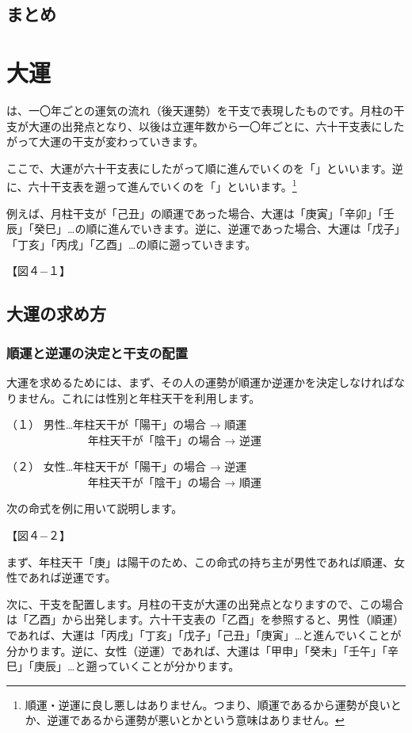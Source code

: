\documentclass[a5paper,11pt,dvipdfmx]{tarticle}
\begin{document}
\subsection{まとめ}


\clearpage

\section{大運}

は、一〇年ごとの運気の流れ（後天運勢）を干支で表現したものです。月柱の干支が大運の出発点となり、以後は立運年数から一〇年ごとに、六十干支表にしたがって大運の干支が変わっていきます。

ここで、大運が六十干支表にしたがって順に進んでいくのを「」といいます。逆に、六十干支表を遡って進んでいくのを「」といいます。\footnote{順運・逆運に良し悪しはありません。つまり、順運であるから運勢が良いとか、逆運であるから運勢が悪いとかという意味はありません。}

例えば、月柱干支が「己丑」の順運であった場合、大運は「庚寅」「辛卯」「壬辰」「癸巳」…の順に進んでいきます。逆に、逆運であった場合、大運は「戊子」「丁亥」「丙戌」「乙酉」…の順に遡っていきます。

【図４−１】

\subsection{大運の求め方}
\subsubsection*{順運と逆運の決定と干支の配置}
大運を求めるためには、まず、その人の運勢が順運か逆運かを決定しなければなりません。これには性別と年柱天干を利用します。

（１）	男性…年柱天干が「陽干」の場合 → 順運\\
　　　　　　　 年柱天干が「陰干」の場合 → 逆運

（２）	女性…年柱天干が「陽干」の場合 → 逆運\\
　　　　　　　 年柱天干が「陰干」の場合 → 順運

次の命式を例に用いて説明します。

【図４−２】

まず、年柱天干「庚」は陽干のため、この命式の持ち主が男性であれば順運、女性であれば逆運です。

次に、干支を配置します。月柱の干支が大運の出発点となりますので、この場合は「乙酉」から出発します。六十干支表の「乙酉」を参照すると、男性（順運）であれば、大運は「丙戌」「丁亥」「戊子」「己丑」「庚寅」…と進んでいくことが分かります。逆に、女性（逆運）であれば、大運は「甲申」「癸未」「壬午」「辛巳」「庚辰」…と遡っていくことが分かります。
\end{document}
